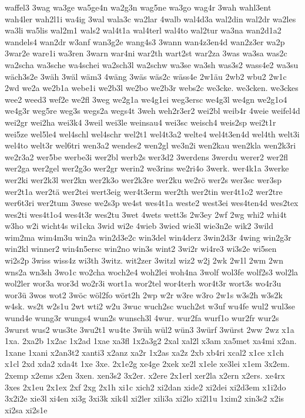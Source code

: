 {waffel3
3wag
wa3ge
wa5ge4n
wa2g3n
wag5ne
wa3go
wag4r
3wah
wahl3ent
wah4ler
wah2l1i
wa4ig
3wal
wala3c
wa2lar
4walb
wal4d3a
wal2din
wal2dr
wa2les
wa3li
wa5lis
wal2m1
wals2
wal4t1a
wal4terl
wal4to
wal2tur
wa3na
wan2d1a2
wandels4
wan2dr
w3anf
wan3g2e
wang4s3
3wann
wan4z3en4d
wan2z3er
wa2p
3war2e
ware1i
wa3ren
3warn
war4ni
war2th
wart2st
war2za
3was
wa3sa
was2c
wa2scha
wa3sche
wa4schei
wa2sch3l
wa2schw
wa3se
wa3sh
was3s2
wass4e2
wa3su
wäch3s2e
3wäh
3wäl
wäm3
4wäng
3wäs
wäs2c
wäss4e
2w1äu
2wb2
wbu2
2w1c
2wd
we2a
we2b1a
webe1i
we2b3l
we2bo
we2b3r
webs2c
we3cke.
we3cken.
we3ckes
wee2
weed3
wef2e
we2fl
3weg
we2g1a
we4g1ei
weg3ersc
we4g3l
we4gn
we2g1o4
we4g3r
weg5re
weg3s
wegs2a
wegs4t
3weh
weh2r3er2
wei2bl
weib4r
4weie
weifel4d
wei2gr
wei2ha
wei3k4
3weil
wei3le
weinsau4
wei3sc
weisch4
weis2sp
wei2t1r
wei5ze
wel5le4
wel4schl
wel4schr
wel2t1
wel4t3a2
welte4
wel4t3en4d
wel4th
welt3i
wel4to
welt3r
wel6tri
wen3a2
wendes2
wen2gl
we3n2i
wen2kau
wen2kla
wen2k3ri
we2r3a2
wer5be
werbe3i
wer2bl
werb2s
wer3d2
3werdens
3werdu
werer2
wer2fl
wer2ga
wer2gel
wer2g3o
wer2gr
werin2
we3rins
we2ri4o
3werk.
wer4k1a
3werke
wer2ki
wer2k3l
wer2kn
wer2k3o
wer2k3re
wer2ku
we2rö
wer2s
wer3sc
wer3sp
wer2t1a
wer2tä
wer2tei
wert3eig
wer4t3erm
wer2th
wer2tin
wer4t1o2
wer2tre
wer6t3ri
wer2tum
3wese
we2s3p
we4st
wes4t1a
weste2
west3ei
wes4ten4d
wes2tex
wes2ti
wes4t1o4
wes4t3r
wes2tu
3wet
4wets
wett3s
2w3ey
2wf
2wg
whi2
whi4t
w3ho
w2i
wicht4s
wi1cka
3wid
wi2e
4wieb
3wied
wie3l
wie3n2e
wik2
3wild
wim2ma
wim4m3u
win2a
win2d3e2c
win3del
win4derz
3win2d3r
4wing
win2g3r
win2kl
winner2
win4n5ersc
win2no
win3s
wint2
3wi2r
wi4re3
wi3s2e
wi5sen
wi2s2p
3wiss
wiss4z
wi3th
3witz.
wit2zer
3witzl
wiz2
w2j
2wk
2w1l
2wm
2wn
wns2a
wn3sh
3wo1c
wo2cha
woch2e4
woh2lei
woh4na
3wolf
wol3fe
wolf2s3
wol2la
wol2ler
wor3a
wor3d
wo2r3i
wort1a
wor2tel
wor4terh
wor4t3r
wort3s
wo4r3u
wor3ü
3wos
wot2
3wöc
wöl2fo
wört2h
2wp
w2r
w3re
w3ro
2w1s
w3s2h
w3s2k
w4sk.
ws2t
w2s1u
2wt
wti2
w2u
3wuc
wuch2sc
wuch2st
w3uf
wu4fe
wul2
wul3se
wund4e
wung3r
wungs4
wun2s
wunsch3l
4wur.
wur2fa
wurf1o
wur2fr
wur2s
3wurst
wus2
wus3te
3wu2t1
wu4te
3wüh
wül2
wün3
3würf
3würst
2ww
2wz
x1a
1xa.
2xa2b
1x2ac
1x2ad
1xae
xa3fl
1x2a3g2
2xal
xal2l
x3am
xa5met
xa4mi
x2an.
1xane
1xani
x2an3t2
xanti3
x2anz
xa2r
1x2as
xa2z
2xb
xb4ri
xcal2
x1ce
x1ch
x1cl
2xd
xda2
xda4t
1xe
3xe.
2x1e2g
xe4ge
2xek
xe2l
x1ele
xe3lei
x1em
3x2em.
2xemp
x2ems
x2en
3xen.
xen3s2
3x2er.
x2ere
2x1erl
xer2la
x2ern
x2ers.
xe4rx
3xes
2x1eu
2x1ex
2xf
2xg
2x1h
xi1c
xich2
xi2dan
xide2
xi2dei
xi2d3em
x1i2do
3x2i2e
xie3l
xi4en
xi3g
3xi3k
xik4l
xi2ler
xili3a
xi2lo
xi2l1u
1xim2
xin3s2
x2is
xi2sa
xi2s1e
}
